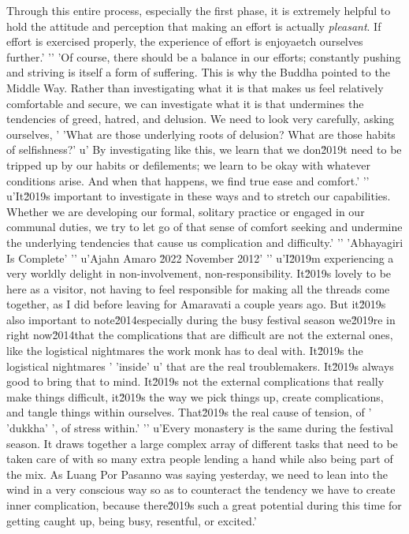 Through this entire process, especially the first phase, it is 
extremely helpful to hold the attitude and perception that making an 
effort is actually \emph{pleasant}. If effort is exercised properly, 
the experience of effort is enjoyaetch ourselves further.'
'\n'
'Of course, there should be a balance in our efforts; constantly pushing and striving is itself a form of suffering. This is why the Buddha pointed to the Middle Way. Rather than investigating what it is that makes us feel relatively comfortable and secure, we can investigate what it is that undermines the tendencies of greed, hatred, and delusion. We need to look very carefully, asking ourselves, '
'What are those underlying roots of delusion? What are those habits of selfishness?'
u' By investigating like this, we learn that we don\u2019t need to be tripped up by our habits or defilements; we learn to be okay with whatever conditions arise. And when that happens, we find true ease and comfort.'
'\n'
u'It\u2019s important to investigate in these ways and to stretch our capabilities. Whether we are developing our formal, solitary practice or engaged in our communal duties, we try to let go of that sense of comfort seeking and undermine the underlying tendencies that cause us complication and difficulty.'
'\n'
'Abhayagiri Is Complete'
'\n'
u'Ajahn Amaro \u2022 November 2012'
'\n'
u'I\u2019m experiencing a very worldly delight in non-involvement, non-responsibility. It\u2019s lovely to be here as a visitor, not having to feel responsible for making all the threads come together, as I did before leaving for Amaravati a couple years ago. But it\u2019s also important to note\u2014especially during the busy festival season we\u2019re in right now\u2014that the complications that are difficult are not the external ones, like the logistical nightmares the work monk has to deal with. It\u2019s the logistical nightmares '
'inside'
u' that are the real troublemakers. It\u2019s always good to bring that to mind. It\u2019s not the external complications that really make things difficult, it\u2019s the way we pick things up, create complications, and tangle things within ourselves. That\u2019s the real cause of tension, of '
'dukkha'
', of stress within.'
'\n'
u'Every monastery is the same during the festival season. It draws together a large complex array of different tasks that need to be taken care of with so many extra people lending a hand while also being part of the mix. As Luang Por Pasanno was saying yesterday, we need to lean into the wind in a very conscious way so as to counteract the tendency we have to create inner complication, because there\u2019s such a great potential during this time for getting caught up, being busy, resentful, or excited.'
